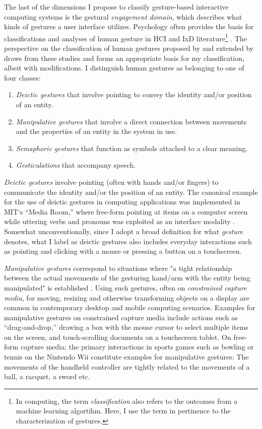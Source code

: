 The last of the dimensions I propose to classify gesture-based interactive computing systems is the gestural \emph{engagement domain}, which describes what kinds of gestures a user interface utilizes. Psychology \parencite{McNeill:1992, McNeill:2008} often provides the basis for classifications and analyses of human gesture in HCI and IxD literature\footnote{In computing, the term \emph{classification} also refers to the outcomes from a machine learning algortihm. Here, I use the term in pertinence to the characterization of gestures.} \parencite{Eisenstein:2006, Kettebekov:2004, Wexelblat:1997}. The perspective on the classification of human gestures proposed by \textcite{Quek:2002} and extended by \textcite{Karam:2005} draws from these studies and forms an appropriate basis for my classification, albeit with modifications. I distinguish human gestures as belonging to one of four classes:

\begin{enumerate}
\item \emph{Deictic gestures} that involve pointing to convey the identity and/or position of an entity.
\item \emph{Manipulative gestures} that involve a direct connection between movements and the properties of an entity in the system in use.
\item \emph{Semaphoric gestures} that function as symbols attached to a clear meaning.
\item \emph{Gesticulations} that accompany speech.
\end{enumerate}

\emph{Deictic gestures} involve pointing (often with hands and/or fingers) to communicate the identity and/or the position of an entity. The canonical example for the use of deictic gestures in computing applications was implemented in MIT‘s “Media Room,” where free-form pointing at items on a computer screen while uttering verbs and pronouns was exploited as an interface modality \parencite{Bolt:1980}. Somewhat unconventionally, since I adopt a broad definition for what \emph{gesture} denotes, what I label as deictic gestures also includes everyday interactions such as pointing and clicking with a mouse or pressing a button on a touchscreen.

\emph{Manipulative gestures} correspond to situations where "a tight relationship between the actual movements of the gesturing hand/arm with the entity being manipulated" is established \parencite{Quek:2002}. Using such gestures, often on \emph{constrained capture media}, for moving, resizing and otherwise transforming objects on a display are common in contemporary desktop and mobile computing scenarios. Examples for manipulative gestures on constrained capture media include actions such as “drag-and-drop,” drawing a box with the mouse cursor to select multiple items on the screen, and touch-scrolling documents on a touchscreen tablet. On free-form capture media; the primary interactions in sports games such as bowling or tennis on the Nintendo Wii constitute examples for manipulative gestures: The movements of the handheld controller are tightly related to the movements of a ball, a racquet, a sword etc.

